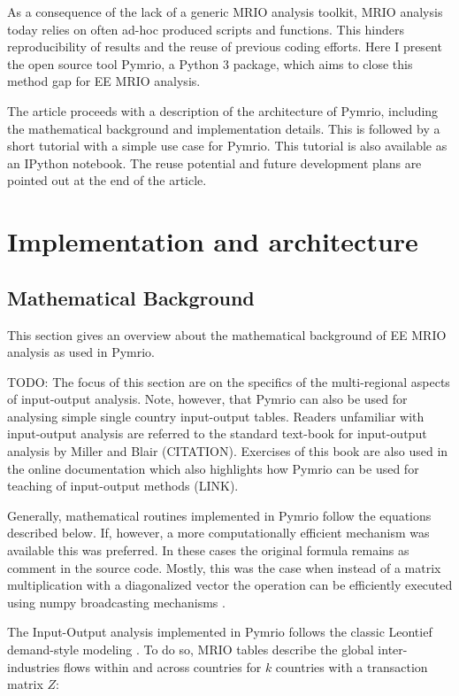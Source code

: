 \documentclass{jors}
\begin{document}
{As a consequence of the lack of a generic MRIO analysis toolkit, MRIO analysis today relies on often ad-hoc produced scripts and functions. This hinders reproducibility of results and the reuse of previous coding efforts.
Here I present the open source tool Pymrio, a Python 3 package, which aims to close this method gap for EE MRIO analysis.

The article proceeds with a description of the architecture of Pymrio, including the mathematical background and implementation details. 
This is followed by a short tutorial with a simple use case for Pymrio. This tutorial is also available as an IPython notebook. 
The reuse potential and future development plans are pointed out at the end of the article.


\section*{Implementation and architecture}

\subsection*{Mathematical Background}

This section gives an overview about the mathematical background of EE MRIO analysis as used in Pymrio. 

TODO: The focus of this section are on the specifics of the multi-regional aspects of input-output analysis. Note, however, that Pymrio can also be used for analysing simple single country input-output tables. Readers unfamiliar with input-output analysis are referred to the standard text-book for input-output analysis by Miller and Blair (CITATION). Exercises of this book are also used in the online documentation which also highlights how Pymrio can be used for teaching of input-output methods (LINK). 

Generally, mathematical routines implemented in Pymrio follow the equations described below.
If, however, a more computationally efficient mechanism was available this was preferred.
In these cases the original formula remains as comment in the source code.
Mostly,  this was the case when instead of a matrix multiplication with a diagonalized vector the operation can be efficiently executed using numpy broadcasting mechanisms \cite{vanderwalt2011_NumPy}.

The Input-Output analysis implemented in Pymrio follows the classic Leontief demand-style modeling  \cite{leontief1970_Environmental}.
To do so, MRIO tables describe the global inter-industries flows within and across countries for $k$ countries with a transaction matrix $Z$:

}
\end{document}
